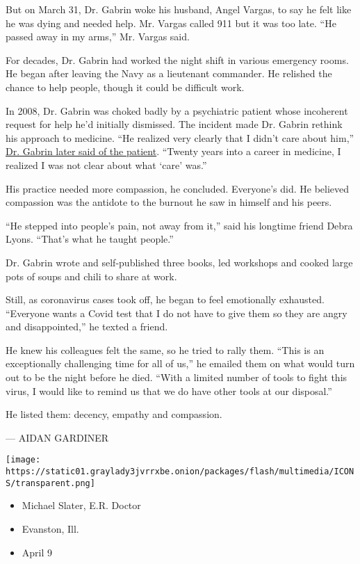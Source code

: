 But on March 31, Dr. Gabrin woke his husband, Angel Vargas, to say he
felt like he was dying and needed help. Mr. Vargas called 911 but it was
too late. ``He passed away in my arms,'' Mr. Vargas said.

For decades, Dr. Gabrin had worked the night shift in various emergency
rooms. He began after leaving the Navy as a lieutenant commander. He
relished the chance to help people, though it could be difficult work.

In 2008, Dr. Gabrin was choked badly by a psychiatric patient whose
incoherent request for help he'd initially dismissed. The incident made
Dr. Gabrin rethink his approach to medicine. ``He realized very clearly
that I didn't care about him,''
\href{https://www.youtube.com/watch?v=6IxPRKdFvxk}{Dr. Gabrin later said
of the patient}. ``Twenty years into a career in medicine, I realized I
was not clear about what `care' was.''

His practice needed more compassion, he concluded. Everyone's did. He
believed compassion was the antidote to the burnout he saw in himself
and his peers.

``He stepped into people's pain, not away from it,'' said his longtime
friend Debra Lyons. ``That's what he taught people.''

Dr. Gabrin wrote and self-published three books, led workshops and
cooked large pots of soups and chili to share at work.

Still, as coronavirus cases took off, he began to feel emotionally
exhausted. ``Everyone wants a Covid test that I do not have to give them
so they are angry and disappointed,'' he texted a friend.

He knew his colleagues felt the same, so he tried to rally them. ``This
is an exceptionally challenging time for all of us,'' he emailed them on
what would turn out to be the night before he died. ``With a limited
number of tools to fight this virus, I would like to remind us that we
do have other tools at our disposal.''

He listed them: decency, empathy and compassion.

--- AIDAN GARDINER

\texttt{[image: https://static01.graylady3jvrrxbe.onion/packages/flash/multimedia/ICONS/transparent.png]}

\begin{itemize}
\tightlist
\item
  Michael Slater, E.R. Doctor
\item
  Evanston, Ill.
\item
  April 9
\end{itemize}

